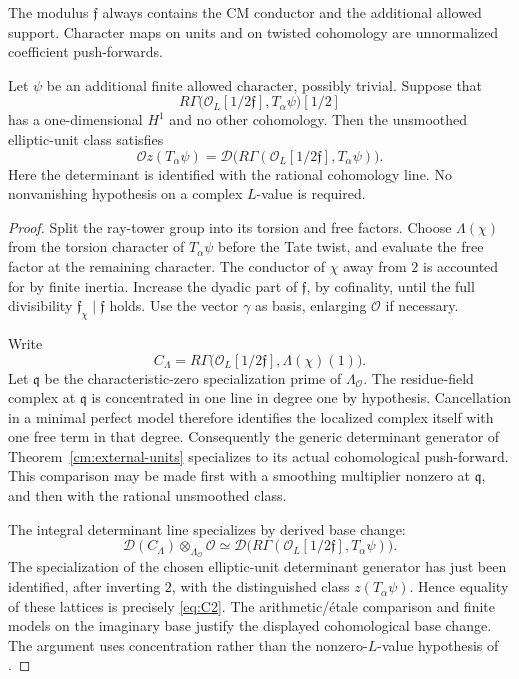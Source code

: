The modulus \(\mathfrak f\) always contains the CM conductor and
the additional allowed support. Character maps on units and on twisted
cohomology are unnormalized coefficient push-forwards.

\begin{lemma}\label{cm:specialization}
Let \(\psi\) be an additional finite allowed character, possibly
trivial. Suppose that
\[
 R\Gamma\bigl(\mathcal O_L[1/2\mathfrak f],T_\alpha\psi\bigr)[1/2]
\]
has a one-dimensional \(H^1\) and no other cohomology.
Then the unsmoothed elliptic-unit class satisfies
\[
 \mathcal O z(T_\alpha\psi)=
 \mathcal D\bigl(R\Gamma(\mathcal O_L[1/2\mathfrak f],
                                      T_\alpha\psi)\bigr).
 \tag{C2}\label{eq:C2}
\]
Here the determinant is identified with the rational cohomology line.
No nonvanishing hypothesis on a complex \(L\)-value is required.
\end{lemma}

\begin{proof}
Split the ray-tower group into its torsion and free factors. Choose
\(\Lambda(\chi)\) from the torsion character of \(T_\alpha\psi\)
before the Tate twist, and evaluate the free factor at the remaining
character. The conductor of \(\chi\) away from \(2\) is accounted for
by finite inertia. Increase the dyadic part of \(\mathfrak f\), by
cofinality, until the full divisibility
\(\mathfrak f_\chi\mid\mathfrak f\) holds. Use the vector \(\gamma\)
as basis, enlarging \(\mathcal O\) if necessary.

Write
\[
 C_\Lambda=R\Gamma\bigl(\mathcal O_L[1/2\mathfrak f],
                                     \Lambda(\chi)(1)\bigr).
\]
Let \(\mathfrak q\) be the characteristic-zero specialization prime
of \(\Lambda_{\mathcal O}\). The residue-field complex at
\(\mathfrak q\) is concentrated in one line in degree one by hypothesis.
Cancellation in a minimal perfect model therefore identifies the
localized complex itself with one free term in that degree.
Consequently the generic determinant generator of
Theorem~\ref{cm:external-units} specializes to its actual
cohomological push-forward. This comparison may be made first with
a smoothing multiplier nonzero at \(\mathfrak q\), and then with
the rational unsmoothed class.

The integral determinant line specializes by derived base change:
\[
 \mathcal D(C_{\Lambda})\otimes_{\Lambda_{\mathcal O}}\mathcal O
 \simeq
 \mathcal D\bigl(R\Gamma(\mathcal O_L[1/2\mathfrak f],
                                      T_\alpha\psi)\bigr).
\]
The specialization of the chosen elliptic-unit determinant generator
has just been identified, after inverting \(2\), with the distinguished
class \(z(T_\alpha\psi)\). Hence equality of these lattices is precisely
\eqref{eq:C2}. The arithmetic/étale comparison and finite models on
the imaginary base justify the displayed cohomological base change.
The argument uses concentration rather than the nonzero-\(L\)-value
hypothesis of \cite[Proposition~4.1]{BF23}.
\end{proof}

